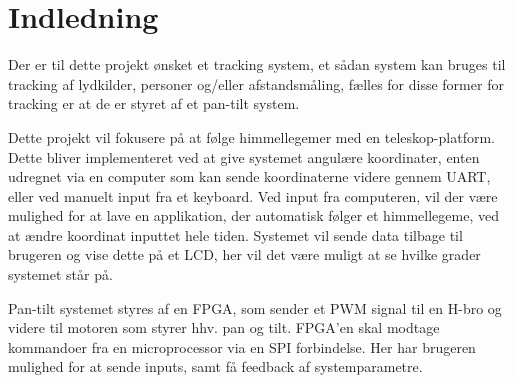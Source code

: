 \section{Indledning}
Der er til dette projekt ønsket et tracking system, et sådan system kan bruges til tracking af lydkilder, personer og/eller afstandsmåling, fælles for disse former for tracking er at de er styret af et pan-tilt system.

Dette projekt vil fokusere på at følge himmellegemer med en teleskop-platform. Dette bliver implementeret ved at give systemet angulære koordinater, enten udregnet via en computer som kan sende koordinaterne videre gennem UART, eller ved manuelt input fra et keyboard. Ved input fra computeren, vil der være mulighed for at lave en applikation, der automatisk følger et himmellegeme, ved at ændre koordinat inputtet hele tiden.
Systemet vil sende data tilbage til brugeren og vise dette på et LCD, her vil det være muligt at se hvilke grader systemet står på.

Pan-tilt systemet styres af en FPGA, som sender et PWM signal til en H-bro og videre til motoren som styrer hhv. pan og tilt.
FPGA’en skal modtage kommandoer fra en microprocessor via en SPI forbindelse.
Her har brugeren mulighed for at sende inputs, samt få feedback af systemparametre.


